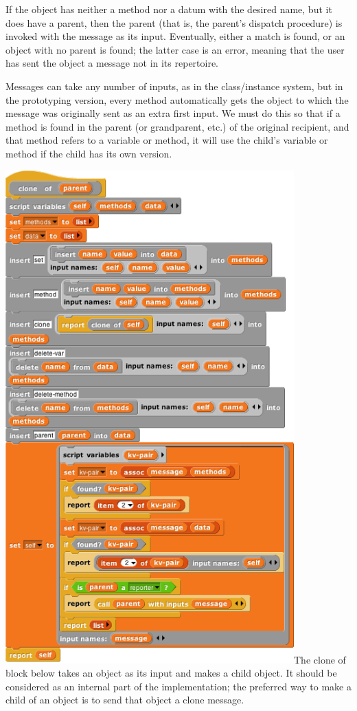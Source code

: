 If the object has neither a method nor a datum with the desired name,
but it does have a parent, then the parent (that is, the parent's
dispatch procedure) is invoked with the message as its input.
Eventually, either a match is found, or an object with no parent is
found; the latter case is an error, meaning that the user has sent the
object a message not in its repertoire.

Messages can take any number of inputs, as in the class/instance system,
but in the prototyping version, every method automatically gets the
object to which the message was originally sent as an extra ﬁrst input.
We must do this so that if a method is found in the parent (or
grandparent, etc.) of the original recipient, and that method refers to
a variable or method, it will use the child's variable or method if the
child has its own version.

\includegraphics[width=4.375in,height=7.46944in]{media/image864.png}The
clone of block below takes an object as its input and makes a child
object. It should be considered as an internal part of the
implementation; the preferred way to make a child of an object is to
send that object a clone message.


